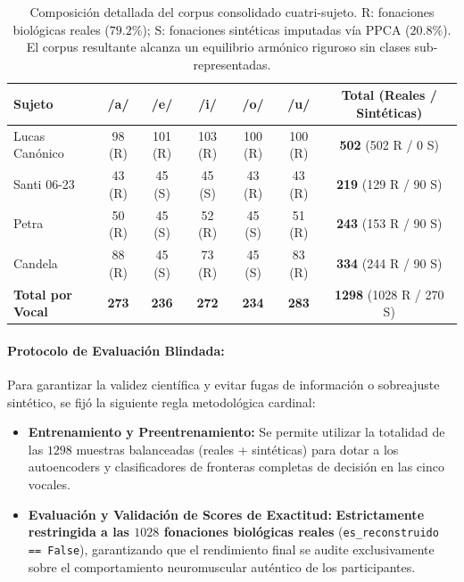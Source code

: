 \documentclass[11pt,a4paper,openany]{book}
\theoremstyle{definition}
\begin{document}
\begin{table}[H]
\centering
\small
\begin{tabular}{lcccccc}
\toprule
\textbf{Sujeto} & \textbf{/a/} & \textbf{/e/} & \textbf{/i/} & \textbf{/o/} & \textbf{/u/} & \textbf{Total (Reales / Sintéticas)} \\
\midrule
Lucas Canónico & 98 (R) & 101 (R) & 103 (R) & 100 (R) & 100 (R) & \textbf{502} (502 R / 0 S) \\
Santi 06-23    & 43 (R) & 45 (S)  & 45 (S)  & 43 (R)  & 43 (R)  & \textbf{219} (129 R / 90 S) \\
Petra          & 50 (R) & 45 (S)  & 52 (R)  & 45 (S)  & 51 (R)  & \textbf{243} (153 R / 90 S) \\
Candela        & 88 (R) & 45 (S)  & 73 (R)  & 45 (S)  & 83 (R)  & \textbf{334} (244 R / 90 S) \\
\midrule
\textbf{Total por Vocal} & \textbf{273} & \textbf{236} & \textbf{272} & \textbf{234} & \textbf{283} & \textbf{1298} (1028 R / 270 S) \\
\bottomrule
\end{tabular}
\caption{Composición detallada del corpus consolidado cuatri-sujeto. R: fonaciones biológicas reales ($79.2\%$); S: fonaciones sintéticas imputadas vía PPCA ($20.8\%$). El corpus resultante alcanza un equilibrio armónico riguroso sin clases sub-representadas.}
\label{tab:dataset_entrenamiento_balanceado}
\end{table}

\paragraph{Protocolo de Evaluación Blindada:}
Para garantizar la validez científica y evitar fugas de información o sobreajuste sintético, se fijó la siguiente regla metodológica cardinal:
\begin{itemize}
    \item \textbf{Entrenamiento y Preentrenamiento:} Se permite utilizar la totalidad de las $1298$ muestras balanceadas (reales + sintéticas) para dotar a los autoencoders y clasificadores de fronteras completas de decisión en las cinco vocales.
    \item \textbf{Evaluación y Validación de Scores de Exactitud:} \textbf{Estrictamente restringida a las $1028$ fonaciones biológicas reales} (\texttt{es\_reconstruido == False}), garantizando que el rendimiento final se audite exclusivamente sobre el comportamiento neuromuscular auténtico de los participantes.
\end{itemize}
\end{document}
